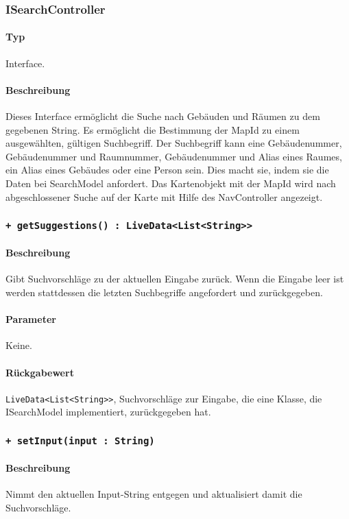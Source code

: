 \subsubsection{ISearchController}
\paragraph*{Typ}
Interface.
\paragraph*{Beschreibung}
Dieses Interface ermöglicht die Suche nach Gebäuden und Räumen zu dem gegebenen String. 
Es ermöglicht die Bestimmung der MapId zu einem ausgewählten, gültigen Suchbegriff. 
Der Suchbegriff kann eine Gebäudenummer, Gebäudenummer und Raumnummer, Gebäudenummer und Alias eines Raumes, ein Alias eines Gebäudes oder eine Person sein.
Dies macht sie, indem sie die Daten bei SearchModel anfordert.
Das Kartenobjekt mit der MapId wird nach abgeschlossener Suche auf der Karte mit Hilfe des NavController angezeigt.


\subsubsection*{\texttt{+ getSuggestions() : LiveData<List<String>>}}%
\paragraph*{Beschreibung}
Gibt Suchvorschläge zu der aktuellen Eingabe zurück.
Wenn die Eingabe leer ist werden stattdessen die letzten Suchbegriffe angefordert und zurückgegeben.
\paragraph*{Parameter}
Keine.
\paragraph*{Rückgabewert}
\texttt{LiveData<List<String>>}, Suchvorschläge zur Eingabe, die eine Klasse, die ISearchModel implementiert, zurückgegeben hat.

\subsubsection*{\texttt{+ setInput(input : String)}}%
\paragraph*{Beschreibung}
Nimmt den aktuellen Input-String entgegen und aktualisiert damit die Suchvorschläge.
